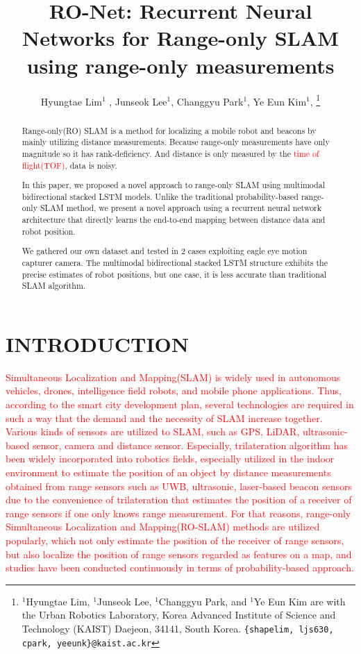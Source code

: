 \documentclass[letterpaper, 10 pt, conference]{ieeeconf}  %
\title{\LARGE \bf
RO-Net: Recurrent Neural Networks for Range-only SLAM using range-only measurements}
\author{Hyungtae Lim$^{1}$ , Junseok Lee$^{1}$, Changgyu Park$^{1}$, Ye Eun Kim$^{1}$, %
\thanks{$^{1}$Hyungtae Lim, $^{1}$Junseok Lee, $^{1}$Changgyu Park, and $^{1}$Ye Eun Kim are with
	the Urban Robotics Laboratory, Korea Advanced Institute of Science
	and Technology (KAIST) Daejeon, 34141, South Korea. {\tt\small \{shapelim, ljs630, cpark, yeeunk\}@kaist.ac.kr}}%
%
}
\begin{document}


\maketitle
\thispagestyle{empty}
\pagestyle{empty}


\begin{abstract}

Range-only(RO) SLAM is a method for localizing a mobile robot and beacons by mainly utilizing distance measurements. Because range-only measurements have only magnitude so it has rank-deficiency. And distance is only measured by the \textcolor{red}{time of flight(TOF)}, data is noisy.

In this paper, we proposed a novel approach to range-only SLAM using multimodal bidirectional stacked LSTM models. Unlike the traditional probability-based range-only SLAM method, we present a novel approach using a recurrent neural network architecture that directly learns the end-to-end mapping between distance data and robot position.

We gathered our own dataset and tested in 2 cases exploiting eagle eye motion capturer camera. The multimodal bidirectional stacked LSTM structure exhibits the precise estimates of robot positions, but one case, it is less accurate than traditional SLAM algorithm. 


\end{abstract}


\section{INTRODUCTION}

 
 \textcolor{red}{Simultaneous Localization and Mapping(SLAM) is widely used in autonomous vehicles, drones, intelligence field robots, and mobile phone applications. Thus, according to the smart city development plan, several technologies are required in such a way that the demand and the necessity of SLAM increase together. Various kinds of sensors are utilized to SLAM, such as GPS, LiDAR, ultrasonic-based sensor, camera and distance sensor. Especially, trilateration algorithm has been widely incorporated into robotics fields, especially utilized in the indoor environment to estimate the position of an object by distance measurements obtained from range sensors such as UWB, ultrasonic, laser-based beacon sensors \cite{thomas2005revisiting, cho2010mobile,raghavan2010accurate} due to the convenience of trilateration that estimates the position of a receiver of range sensors if one only knows range measurement. For that reasons, range-only Simultaneous Localization and Mapping(RO-SLAM) methods are utilized popularly, which not only estimate the position of the receiver of range sensors, but also localize the position of range sensors regarded as features on a map, and studies have been conducted continuously in terms of probability-based approach\cite{blanco2008pure,blanco2008efficient,fabresse2013undelayed, shetty2018particle}.
}
\end{document}
